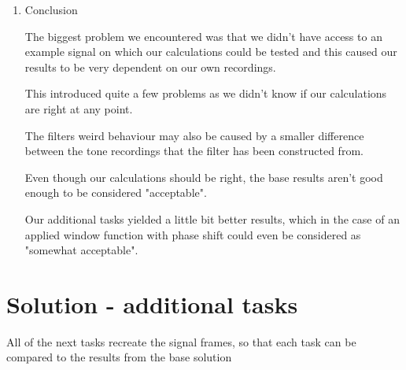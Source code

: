 \documentclass[a4paper, 11pt]{article}
\begin{document}
\begin{enumerate}
        \item
        Conclusion

        The biggest problem we encountered was that we didn't have access to an example signal
        on which our calculations could be tested and this caused our results to be very dependent
        on our own recordings.

        This introduced quite a few problems
        as we didn't know if our calculations are right at any point.

        The filters weird behaviour may also be caused by a smaller difference between the tone recordings
        that the filter has been constructed from.

        Even though our calculations should be right, the base results aren't good enough to be considered "acceptable".

        Our additional tasks yielded a little bit better results,
        which in the case of an applied window function
        with phase shift could even be considered as "somewhat acceptable".

    \end{enumerate}

    \newpage
    \section*{Solution - additional tasks}

    All of the next tasks recreate the signal frames,
    so that each task can be compared to the results from the base solution
\end{document}
